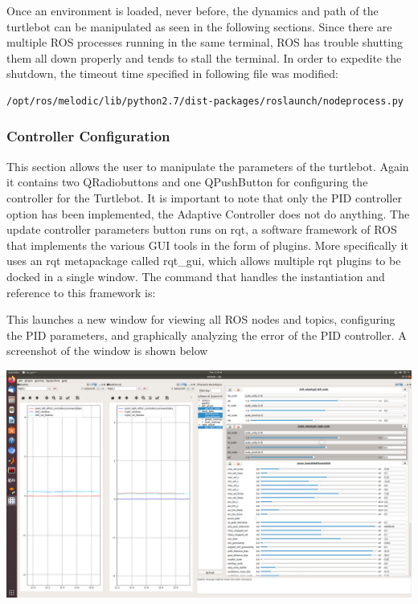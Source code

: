 \documentclass[12]{article}
\begin{document}
Once an environment is loaded, never before, the dynamics and path of the turtlebot can be manipulated as seen in the following sections. Since there are multiple ROS processes running in the same terminal, ROS has trouble shutting them all down properly and tends to stall the terminal. In order to expedite the shutdown, the timeout time specified in following file was modified:

\begin{lstlisting}[style=bash]
/opt/ros/melodic/lib/python2.7/dist-packages/roslaunch/nodeprocess.py
\end{lstlisting}

\subsubsection{Controller Configuration}
This section allows the user to manipulate the parameters of the turtlebot. Again it contains two QRadiobuttons and one QPushButton for configuring the controller for the Turtlebot. It is important to note that only the PID controller option has been implemented, the Adaptive Controller does not do anything. The update controller parameters button runs on rqt, a software framework of ROS that implements the various GUI tools in the form of plugins. More specifically it uses an rqt metapackage called rqt\_gui, which allows multiple rqt plugins to be docked in a single window. The command that handles the instantiation and reference to this framework is:

This launches a new window for viewing all ROS nodes and topics, configuring the PID parameters, and graphically analyzing the error of the PID controller. 
A screenshot of the window is shown below
\begin{center}
\includegraphics[width=0.9\linewidth]{images/rqt_gui.png} \\
\end{center}
\end{document}
